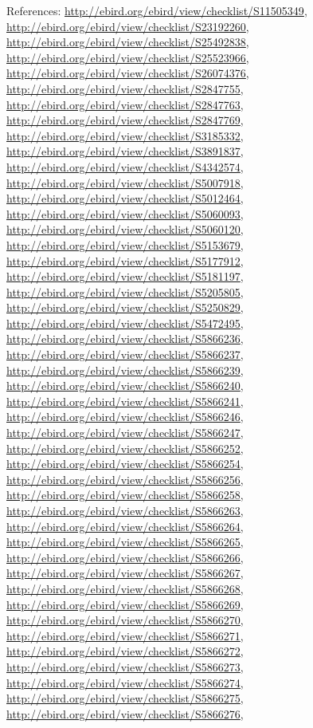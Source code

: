\documentclass[9pt, article]{memoir}
\begin{document}
\begin{multicols}{2}
\vspace{6pt}References: 
\url{http://ebird.org/ebird/view/checklist/S11505349}, 
\url{http://ebird.org/ebird/view/checklist/S23192260}, 
\url{http://ebird.org/ebird/view/checklist/S25492838}, 
\url{http://ebird.org/ebird/view/checklist/S25523966}, 
\url{http://ebird.org/ebird/view/checklist/S26074376}, 
\url{http://ebird.org/ebird/view/checklist/S2847755}, 
\url{http://ebird.org/ebird/view/checklist/S2847763}, 
\url{http://ebird.org/ebird/view/checklist/S2847769}, 
\url{http://ebird.org/ebird/view/checklist/S3185332}, 
\url{http://ebird.org/ebird/view/checklist/S3891837}, 
\url{http://ebird.org/ebird/view/checklist/S4342574}, 
\url{http://ebird.org/ebird/view/checklist/S5007918}, 
\url{http://ebird.org/ebird/view/checklist/S5012464}, 
\url{http://ebird.org/ebird/view/checklist/S5060093}, 
\url{http://ebird.org/ebird/view/checklist/S5060120}, 
\url{http://ebird.org/ebird/view/checklist/S5153679}, 
\url{http://ebird.org/ebird/view/checklist/S5177912}, 
\url{http://ebird.org/ebird/view/checklist/S5181197}, 
\url{http://ebird.org/ebird/view/checklist/S5205805}, 
\url{http://ebird.org/ebird/view/checklist/S5250829}, 
\url{http://ebird.org/ebird/view/checklist/S5472495}, 
\url{http://ebird.org/ebird/view/checklist/S5866236}, 
\url{http://ebird.org/ebird/view/checklist/S5866237}, 
\url{http://ebird.org/ebird/view/checklist/S5866239}, 
\url{http://ebird.org/ebird/view/checklist/S5866240}, 
\url{http://ebird.org/ebird/view/checklist/S5866241}, 
\url{http://ebird.org/ebird/view/checklist/S5866246}, 
\url{http://ebird.org/ebird/view/checklist/S5866247}, 
\url{http://ebird.org/ebird/view/checklist/S5866252}, 
\url{http://ebird.org/ebird/view/checklist/S5866254}, 
\url{http://ebird.org/ebird/view/checklist/S5866256}, 
\url{http://ebird.org/ebird/view/checklist/S5866258}, 
\url{http://ebird.org/ebird/view/checklist/S5866263}, 
\url{http://ebird.org/ebird/view/checklist/S5866264}, 
\url{http://ebird.org/ebird/view/checklist/S5866265}, 
\url{http://ebird.org/ebird/view/checklist/S5866266}, 
\url{http://ebird.org/ebird/view/checklist/S5866267}, 
\url{http://ebird.org/ebird/view/checklist/S5866268}, 
\url{http://ebird.org/ebird/view/checklist/S5866269}, 
\url{http://ebird.org/ebird/view/checklist/S5866270}, 
\url{http://ebird.org/ebird/view/checklist/S5866271}, 
\url{http://ebird.org/ebird/view/checklist/S5866272}, 
\url{http://ebird.org/ebird/view/checklist/S5866273}, 
\url{http://ebird.org/ebird/view/checklist/S5866274}, 
\url{http://ebird.org/ebird/view/checklist/S5866275}, 
\url{http://ebird.org/ebird/view/checklist/S5866276}, 

\end{multicols}
\end{document}
